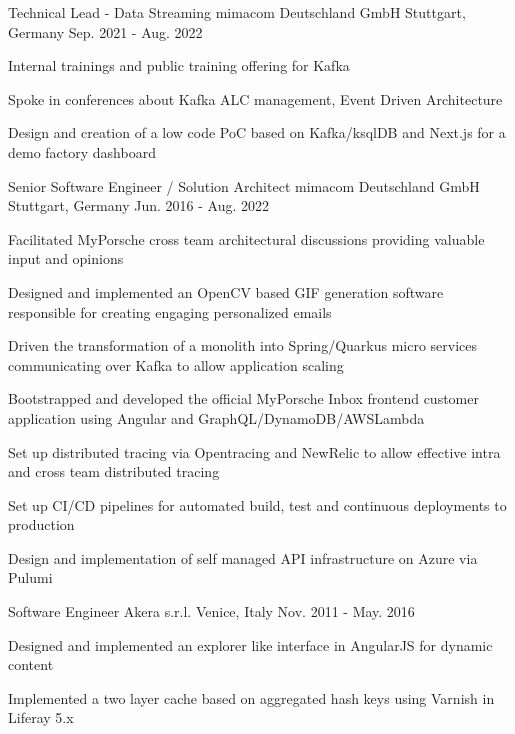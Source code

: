 \begin{cventries}
  \cventry
    {Technical Lead - Data Streaming} %
    {mimacom Deutschland GmbH} %
    {Stuttgart, Germany} %
    {Sep. 2021 - Aug. 2022} %
    {
      \begin{cvitems} %
        \item {Internal trainings and public training offering for Kafka}
        \item {Spoke in conferences about Kafka ALC management, Event Driven Architecture}
        \item {Design and creation of a low code PoC based on Kafka/ksqlDB and Next.js for a demo factory dashboard}
      \end{cvitems}
    }

  \cventry
    {Senior Software Engineer / Solution Architect} %
    {mimacom Deutschland GmbH} %
    {Stuttgart, Germany} %
    {Jun. 2016 - Aug. 2022} %
    {
      \begin{cvitems} %
        \item {Facilitated MyPorsche cross team architectural discussions providing valuable input and opinions}
        \item {Designed and implemented an OpenCV based GIF generation software responsible for creating engaging personalized emails}
        \item {Driven the transformation of a monolith into Spring/Quarkus micro services communicating over Kafka to allow application scaling}
        \item {Bootstrapped and developed the official MyPorsche Inbox frontend customer application using Angular and GraphQL/DynamoDB/AWSLambda}
        \item {Set up distributed tracing via Opentracing and NewRelic to allow effective intra and cross team distributed tracing}
        \item {Set up CI/CD pipelines for automated build, test and continuous deployments to production}
        \item {Design and implementation of self managed API infrastructure on Azure via Pulumi}
      \end{cvitems}
    }

  \cventry
    {Software Engineer} %
    {Akera s.r.l.} %
    {Venice, Italy} %
    {Nov. 2011 - May. 2016} %
    {
      \begin{cvitems} %
        \item {Designed and implemented an explorer like interface in AngularJS for dynamic content}
        \item {Implemented a two layer cache based on aggregated hash keys using Varnish in Liferay 5.x}
      \end{cvitems}
    }

\end{cventries}
